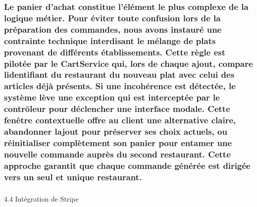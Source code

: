 \documentclass[
]{article}
\begin{document}
\subsubsection{Le panier d'achat constitue l'élément le plus complexe de
la logique métier. Pour éviter toute confusion lors de la préparation
des commandes, nous avons instauré une contrainte technique interdisant
le mélange de plats provenant de différents établissements. Cette règle
est pilotée par le CartService qui, lors de chaque ajout, compare
l\textquotesingle identifiant du restaurant du nouveau plat avec celui
des articles déjà présents. Si une incohérence est détectée, le système
lève une exception qui est interceptée par le contrôleur pour déclencher
une interface modale. Cette fenêtre contextuelle offre au client une
alternative claire, abandonner l\textquotesingle ajout pour préserver
ses choix actuels, ou réinitialiser complètement son panier pour entamer
une nouvelle commande auprès du second restaurant. Cette approche
garantit que chaque commande générée est dirigée vers un seul et unique
restaurant.}\label{le-panier-dachat-constitue-luxe9luxe9ment-le-plus-complexe-de-la-logique-muxe9tier.-pour-uxe9viter-toute-confusion-lors-de-la-pruxe9paration-des-commandes-nous-avons-instauruxe9-une-contrainte-technique-interdisant-le-muxe9lange-de-plats-provenant-de-diffuxe9rents-uxe9tablissements.-cette-ruxe8gle-est-pilotuxe9e-par-le-cartservice-qui-lors-de-chaque-ajout-compare-lidentifiant-du-restaurant-du-nouveau-plat-avec-celui-des-articles-duxe9juxe0-pruxe9sents.-si-une-incohuxe9rence-est-duxe9tectuxe9e-le-systuxe8me-luxe8ve-une-exception-qui-est-interceptuxe9e-par-le-contruxf4leur-pour-duxe9clencher-une-interface-modale.-cette-fenuxeatre-contextuelle-offre-au-client-une-alternative-claire-abandonner-lajout-pour-pruxe9server-ses-choix-actuels-ou-ruxe9initialiser-compluxe8tement-son-panier-pour-entamer-une-nouvelle-commande-aupruxe8s-du-second-restaurant.-cette-approche-garantit-que-chaque-commande-guxe9nuxe9ruxe9e-est-diriguxe9e-vers-un-seul-et-unique-restaurant.}

\subsubsection{}\label{section-8}

4.4 Intégration de Stripe
\end{document}
